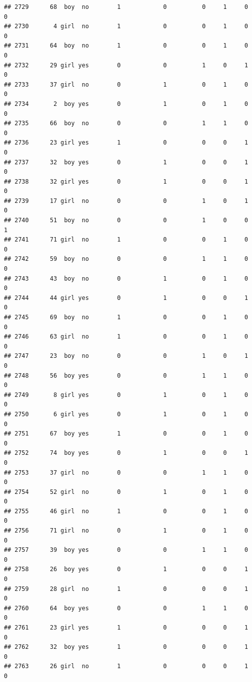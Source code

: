 \documentclass[man]{apa6}
\begin{document}
\begin{verbatim}
## 2729      68  boy  no        1            0          0     1     0     0
## 2730       4 girl  no        1            0          0     1     0     0
## 2731      64  boy  no        1            0          0     1     0     0
## 2732      29 girl yes        0            0          1     0     1     0
## 2733      37 girl  no        0            1          0     1     0     0
## 2734       2  boy yes        0            1          0     1     0     0
## 2735      66  boy  no        0            0          1     1     0     0
## 2736      23 girl yes        1            0          0     0     1     0
## 2737      32  boy yes        0            1          0     0     1     0
## 2738      32 girl yes        0            1          0     0     1     0
## 2739      17 girl  no        0            0          1     0     1     0
## 2740      51  boy  no        0            0          1     0     0     1
## 2741      71 girl  no        1            0          0     1     0     0
## 2742      59  boy  no        0            0          1     1     0     0
## 2743      43  boy  no        0            1          0     1     0     0
## 2744      44 girl yes        0            1          0     0     1     0
## 2745      69  boy  no        1            0          0     1     0     0
## 2746      63 girl  no        1            0          0     1     0     0
## 2747      23  boy  no        0            0          1     0     1     0
## 2748      56  boy yes        0            0          1     1     0     0
## 2749       8 girl yes        0            1          0     1     0     0
## 2750       6 girl yes        0            1          0     1     0     0
## 2751      67  boy yes        1            0          0     1     0     0
## 2752      74  boy yes        0            1          0     0     1     0
## 2753      37 girl  no        0            0          1     1     0     0
## 2754      52 girl  no        0            1          0     1     0     0
## 2755      46 girl  no        1            0          0     1     0     0
## 2756      71 girl  no        0            1          0     1     0     0
## 2757      39  boy yes        0            0          1     1     0     0
## 2758      26  boy yes        0            1          0     0     1     0
## 2759      28 girl  no        1            0          0     0     1     0
## 2760      64  boy yes        0            0          1     1     0     0
## 2761      23 girl yes        1            0          0     0     1     0
## 2762      32  boy yes        1            0          0     0     1     0
## 2763      26 girl  no        1            0          0     0     1     0

\end{verbatim}
\end{document}
